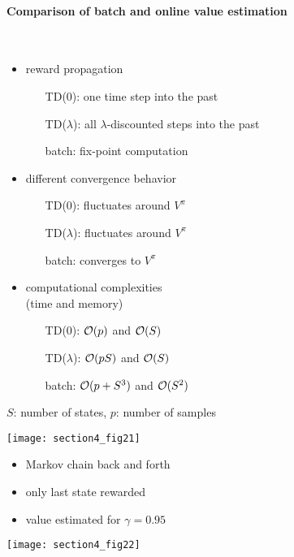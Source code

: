 \paragraph{Comparison of batch and online value estimation}\mbox{}\\
	\begin{minipage}{13cm}
		\begin{minipage}{6.4cm}
			\begin{itemize}
				\item reward propagation
					\begin{itemize}
						\item[TD(0):] {\footnotesize 
							one time step into the past}
						\item[TD($\lambda$):] {\footnotesize 
							all $\lambda$-discounted steps into the past}
						\item[batch:] {\footnotesize fix-point computation}
					\end{itemize}
				\vspace{4mm}
				\item different convergence behavior
					\begin{itemize}
						\item[TD(0):] fluctuates around $V^\pi$
						\item[TD($\lambda$):] fluctuates around $V^\pi$
						\item[batch:] converges to $V^\pi$
					\end{itemize}
				\vspace{4mm}
				\item computational complexities \\[-2mm]
					{\tiny (time and memory)}
					\begin{itemize}
						\item[TD(0):] $\mathcal{O}(p)$ and $\mathcal{O}(S)$
						\item[TD($\lambda$):] $\mathcal{O}(pS)$ and $\mathcal{O}(S)$
						\item[batch:] $\mathcal{O}(p+S^3)$ and $\mathcal{O}(S^2)$
					\end{itemize}
			\end{itemize}
			{\footnotesize $S$: number of states, \hfill $p$: number of samples}
		\end{minipage}
		\begin{minipage}{5.6cm}
			\texttt{[image: section4\_fig21]}
			
			\vspace{1mm}
			\footnotesize
			\begin{itemize}
				\item Markov chain back and forth
				\item only last state rewarded
				\item value estimated for $\gamma = 0.95$
			\end{itemize}
			\vspace{1mm}			

			\texttt{[image: section4\_fig22]}
		\end{minipage}
	\end{minipage}
